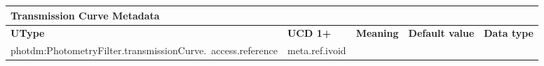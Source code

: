 \documentclass[11pt,a4paper]{ivoa}
\begin{document}
\begin{appendices}



\newpage



\begin{table}[H]
\centering
\begin{adjustbox}{angle=90}
\begin{tabular}{p{2.5in}|p{1.5in}|p{2in}|p{0.74in}|p{0.35in}}
\multicolumn{5}{p{\dimexpr6.59in+8\tabcolsep\relax}}{\centering
{\fontsize{10pt}{12.0pt}\selectfont \textbf{Transmission Curve Metadata}}} \\
\hline
\multicolumn{1}{p{2.5in}}{{\fontsize{8pt}{8pt}\selectfont \textbf{UType}}} &
\multicolumn{1}{p{1.5in}}{{\fontsize{8pt}{8pt}\selectfont \textbf{UCD 1+}}} &
\multicolumn{1}{p{2in}}{{\fontsize{8pt}{8pt}\selectfont \textbf{Meaning}}} &
\multicolumn{1}{p{0.74in}}{{\fontsize{8pt}{8pt}\selectfont \textbf{Default value}}} &
\multicolumn{1}{p{0.35in}}{{\fontsize{8pt}{8pt}\selectfont \textbf{Data type}}} \\
\hline
\multicolumn{1}{p{2.5in}}{{\fontsize{8pt}{8pt}
\selectfont photdm:PhotometryFilter.transmissionCurve.\ access.reference}} &
\multicolumn{1}{p{1.5in}}{{\fontsize{8pt}{8pt}\selectfont meta.ref.ivoid }} &


\end{tabular}
\end{adjustbox}
\end{table}
\end{appendices}
\end{document}
